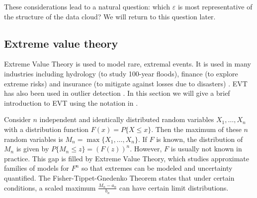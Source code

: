 \documentclass[12pt]{article}
\theoremstyle{definition}
\theoremstyle{definition}
\theoremstyle{definition}
\theoremstyle{definition}
\theoremstyle{remark}
\begin{document}
These considerations lead to a natural question: which \(\varepsilon\) is most representative of the structure of the data cloud? We will return to this question later.

\hypertarget{subsec:evt}{%
\subsection{Extreme value theory}\label{subsec:evt}}

Extreme Value Theory is used to model rare, extremal events. It is used in many industries including hydrology (to study 100-year floods), finance (to explore extreme risks) and insurance (to mitigate against losses due to disasters) \citep{Reiss2001}. EVT has also been used in outlier detection \citep{wilkinson2017visualizing, talagala2019anomaly}. In this section we will give a brief introduction to EVT using the notation in \citet{coles2001introduction}.

Consider \(n\) independent and identically distributed random variables \(X_1, \dots, X_n\) with a distribution function \(F(x) = P\{X \leq x\}\). Then the maximum of these \(n\) random variables is \(M_n = \max \{X_1, \dots, X_n\}\). If \(F\) is known, the distribution of \(M_n\) is given by \citep[p45]{coles2001introduction} \(P\{M_n \leq z \} = \left(F(z)\right)^n\). However, \(F\) is usually not known in practice. This gap is filled by Extreme Value Theory, which studies approximate families of models for \(F^n\) so that extremes can be modeled and uncertainty quantified. The Fisher-Tippet-Gnedenko Theorem states that under certain conditions, a scaled maximum \(\frac{M_n - a_n}{b_n}\) can have certain limit distributions.
\end{document}
